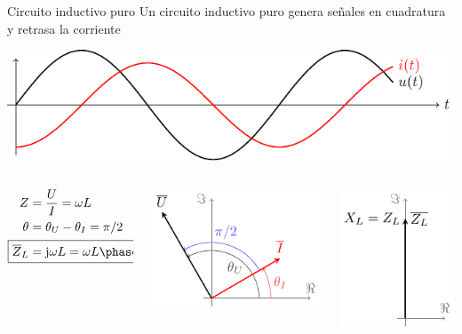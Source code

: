 \documentclass[aspectratio=169, xcolor={usenames,svgnames,dvipsnames}]{beamer}
\begin{document}
\begin{frame}{Circuito inductivo puro}
Un circuito inductivo puro genera \alert{señales en cuadratura} y \alert{retrasa la corriente}

\begin{center}
\includegraphics[height=0.3\textheight]{../figs/inductivoPuro.pdf}
\end{center}

\begin{columns}
\begin{column}{0.3\columnwidth}
\begin{align*}
  Z &= \frac{U}{I} = \omega L\\
  \theta &= \theta_U - \theta_I = \pi/2\\
  \Aboxed{\overline{Z}_L &= \mathrm{j}\omega L = \omega L \phase{\ang{90}}}
\end{align*}
\end{column}


\begin{column}{0.4\columnwidth}
\begin{center}
\includegraphics[height=0.4\textheight]{../figs/fasorInductancia_VI.pdf}
\end{center}
\end{column}


\begin{column}{0.3\columnwidth}
\begin{center}
\includegraphics[height=0.4\textheight]{../figs/fasorInductancia.pdf}
\end{center}
\end{column}
\end{columns}
\end{frame}
\end{document}
